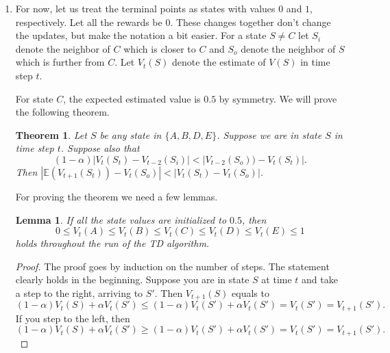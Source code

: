 \documentclass[12pt,a4paper]{article}
\newtheorem{lemma}{Lemma}
\newtheorem{thm}{Theorem}
\begin{document}
\begin{enumerate}
\begin{itemize}
\end{itemize}

\item
For now, let us treat the terminal points as states with values $0$ and $1$,
respectively. Let all the rewards be $0$. These changes together don't change
the updates, but make the notation a bit easier. For a state $S \neq C$ let
$S_i$ denote the neighbor of $C$ which is closer to $C$ and $S_o$ denote the
neighbor of $S$ which is further from $C$. Let $V_t(S)$ denote the estimate of
$V(S)$ in time step $t$.

For state $C$, the expected estimated value is $0.5$ by symmetry. We will prove
the following theorem.
\begin{thm}\label{thm}
  Let $S$ be any state in $\{A, B, D, E\}$. Suppose we are in state $S$ in
  time step $t$. Suppose also that
  \[(1 - \alpha) |V_t(S_t) - V_{t - 2} (S_i)| < |V_{t - 2}(S_o)) - V_t(S_t)|.\] Then
  $|\mathbb{E}(V_{t + 1}(S_t)) - V_{t}(S_o)| < |V_t(S_t) - V_{t}(S_o)|$.
\end{thm}

For proving the theorem we need a few lemmas.

\begin{lemma}
  If all the state values are initialized to $0.5$, then
  \[0 \le V_t(A) \le V_t(B) \le V_t(C) \le V_t(D) \le V_t(E) \le 1\] holds throughout the
  run of the TD algorithm.
\end{lemma}
\begin{proof}
  The proof goes by induction on the number of steps. The statement clearly holds
  in the beginning. Suppose you are in state $S$ at time $t$ and take a step
  to the right, arriving to $S'$. Then $V_{t + 1}(S)$ equals to
  \[(1 - \alpha) V_t(S) + \alpha V_t(S') \le (1 - \alpha) V_t(S') + \alpha V_t(S') = V_t(S') = V_{t + 1}(S').\]
  If you step to the left, then
  \[(1 - \alpha) V_t(S) + \alpha V_t(S') \ge (1 - \alpha) V_t(S') + \alpha V_t(S') = V_t(S') = V_{t + 1}(S').\]
\end{proof}


\end{enumerate}
\end{document}
